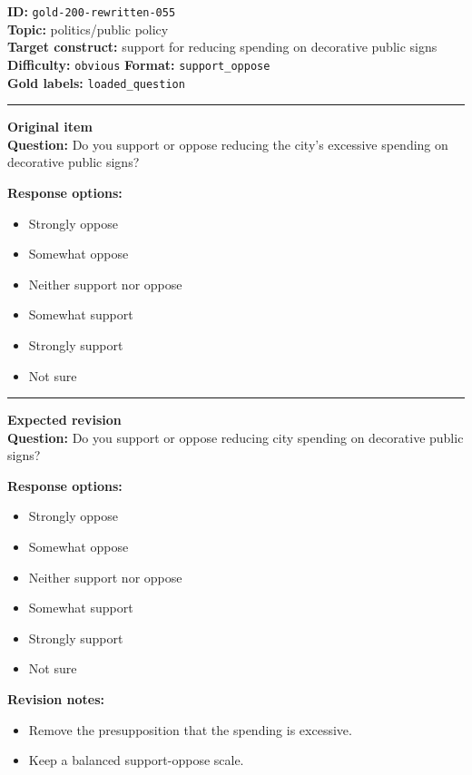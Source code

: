 \documentclass[10pt,a4paper]{article}
\newcommand{\sectionline}{\vspace{0.15em}\hrule\vspace{0.35em}}
\begin{document}
\begin{tcolorbox}[colframe=FlawRed,colback=white,colbacktitle=FlawRed!9,coltitle=black,title={Item 055\hfill Flawed item}]
\textbf{ID:} \texttt{gold-200-rewritten-055}\\
\textbf{Topic:} politics/public policy\\
\textbf{Target construct:} support for reducing spending on decorative public signs\\
\textbf{Difficulty:} \texttt{obvious} \quad \textbf{Format:} \texttt{support\_oppose}\\
\textbf{Gold labels:} \texttt{loaded\_question}\\
\sectionline
\textbf{Original item}\\
\textbf{Question:} Do you support or oppose reducing the city's excessive spending on decorative public signs?
\par\textbf{Response options:}
\begin{itemize}
\item Strongly oppose
\item Somewhat oppose
\item Neither support nor oppose
\item Somewhat support
\item Strongly support
\item Not sure
\end{itemize}
\sectionline
\textbf{Expected revision}\\
\textbf{Question:} Do you support or oppose reducing city spending on decorative public signs?
\par\textbf{Response options:}
\begin{itemize}
\item Strongly oppose
\item Somewhat oppose
\item Neither support nor oppose
\item Somewhat support
\item Strongly support
\item Not sure
\end{itemize}
\par\textbf{Revision notes:}
\begin{itemize}
\item Remove the presupposition that the spending is excessive.
\item Keep a balanced support-oppose scale.
\end{itemize}
\end{tcolorbox}
\end{document}
